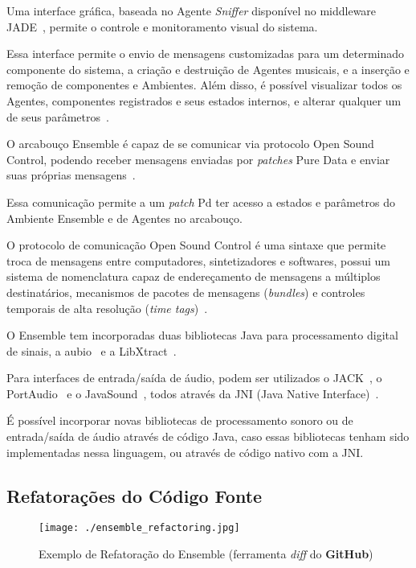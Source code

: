 \documentclass[a4paper, 11pt, twoside]{article}
\begin{document}
\begin{multicols}{2}
Uma interface gráfica, baseada no Agente \textit{Sniffer} disponível no middleware 
JADE~\cite{belli99}, permite o controle e monitoramento visual do sistema.

Essa interface permite o envio de mensagens customizadas para um determinado 
componente do sistema, a criação e destruição de Agentes musicais, e a inserção e 
remoção de componentes e Ambientes. Além disso, é possível visualizar todos os 
Agentes, componentes registrados e seus estados internos, e alterar qualquer um de 
seus parâmetros~\cite{leandro11}.

O arcabouço Ensemble é capaz de se comunicar via protocolo Open Sound 
Control, podendo receber mensagens enviadas por \textit{patches}
Pure Data e enviar suas próprias mensagens~\cite{leandro11}. 

Essa comunicação permite a um \textit{patch} Pd ter acesso a estados e 
parâmetros do Ambiente Ensemble e de Agentes no arcabouço.

O protocolo de comunicação Open Sound Control é uma sintaxe que permite troca de 
mensagens entre computadores, sintetizadores e softwares, possui um sistema de 
nomenclatura capaz de endereçamento de mensagens a múltiplos destinatários, 
mecanismos de pacotes de mensagens (\textit{bundles}) e controles 
temporais de alta resolução (\textit{time tags})~\cite{wright97}.

O Ensemble tem incorporadas duas bibliotecas Java para processamento digital de 
sinais, a aubio~\cite{aubio01} e a LibXtract~\cite{libx01}.

Para interfaces de entrada/saída de áudio, podem ser utilizados o 
JACK~\cite{jack01}, o PortAudio~\cite{port01} e o JavaSound~\cite{jsnd01}, 
todos através da JNI (Java Native Interface)~\cite{JNI}.

É possível incorporar novas bibliotecas de processamento sonoro ou de 
entrada/saída de áudio através de código Java, caso essas bibliotecas
tenham sido implementadas nessa linguagem, ou através de código nativo
com a JNI.

\subsection{Refatorações do Código Fonte}\label{sec:refatoracoes}

\begin{figure}[H]
  \centering
  \texttt{[image: ./ensemble\_refactoring.jpg]}
  \caption{Exemplo de Refatoração do Ensemble (ferramenta \textit{diff} 
  do \textbf{GitHub})}
  \label{fig2}
\end{figure}


\end{multicols}
\end{document}
